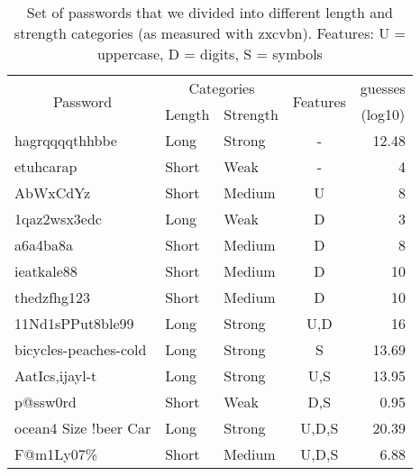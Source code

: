 \begin{table}[htbp]
  \centering
  \caption{Set of passwords that we divided into different length and strength categories (as measured with zxcvbn). Features: U = uppercase, D = digits, S = symbols}
    \begin{tabular}{lllcccr}
    \multicolumn{1}{c}{\multirow{2}[1]{*}{Password}} & \multicolumn{2}{c}{Categories} & \multicolumn{3}{c}{\multirow{2}[1]{*}{Features}} & \multicolumn{1}{c}{guesses} \\
      & Length & Strength & \multicolumn{3}{c}{} & \multicolumn{1}{c}{(log10)} \\
    \midrule
    hagrqqqqthhbbe & Long & Strong & \multicolumn{3}{c}{-} & 12.48 \\
    etuhcarap & Short & Weak & \multicolumn{3}{c}{-} & 4 \\
    AbWxCdYz & Short & Medium & \multicolumn{3}{c}{U} & 8 \\
    1qaz2wsx3edc & Long & Weak & \multicolumn{3}{c}{D} & 3 \\
    a6a4ba8a & Short & Medium & \multicolumn{3}{c}{D} & 8 \\
    ieatkale88 & Short & Medium & \multicolumn{3}{c}{D} & 10 \\
    thedzfhg123 & Short & Medium & \multicolumn{3}{c}{D} & 10 \\
    11Nd1sPPut8ble99 & Long & Strong & \multicolumn{3}{c}{U,D} & 16 \\
    bicycles-peaches-cold & Long & Strong & \multicolumn{3}{c}{S} & 13.69 \\
    AatIcs,ijayl-t & Long & Strong & \multicolumn{3}{c}{U,S} & 13.95 \\
    p@ssw0rd & Short & Weak & \multicolumn{3}{c}{D,S} & 0.95 \\
    ocean4 Size !beer Car & Long & Strong & \multicolumn{3}{c}{U,D,S} & 20.39 \\
    F@m1Ly07\% & Short & Medium & \multicolumn{3}{c}{U,D,S} & 6.88 \\
    \bottomrule
    \end{tabular}%

  \label{tab:password-list}%
  
\end{table}%